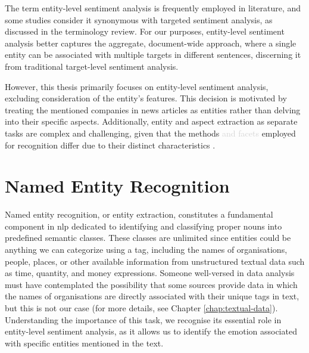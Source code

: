 
The term entity-level sentiment analysis is frequently employed in literature, and some studies consider it synonymous with targeted sentiment analysis, \linebreak as discussed \cite{ronningstad-etal-2022-entity} in the terminology review. For our purposes, entity-level sentiment analysis better captures the aggregate, document-wide approach, where a single entity can be associated with multiple targets in different sentences, discerning it from traditional target-level sentiment analysis. 

However, this thesis primarily focuses on entity-level sentiment analysis, excluding consideration of the entity's features. This decision is motivated by treating the mentioned companies in news articles as entities rather than delving into their specific aspects. Additionally, entity and aspect extraction as separate tasks are complex and challenging, given that the methods \textcolor{lightgray}{and facets} employed for recognition differ due to their distinct characteristics \parencite{Liu2015, Zhang2014}. 

\section{Named Entity Recognition}
\label{sec:named-entity-recognition}
Named entity recognition, or entity extraction, constitutes a fundamental component in \acrshort{nlp} dedicated to identifying and classifying proper nouns into predefined semantic classes. These classes are unlimited since entities could be anything we can categorize using a tag, including the names of organisations, people, places, or other available information from unstructured textual data such as time, quantity, and money expressions. Someone well-versed in data analysis must have contemplated the possibility that some sources provide data in which the names of organisations are directly associated with their unique tags in text, but this is not our case (for more details, see Chapter \ref{chap:textual-data}). Understanding the importance of this task, we recognise its essential role in entity-level sentiment analysis, as it allows us to identify the emotion associated with specific entities mentioned in the text.


